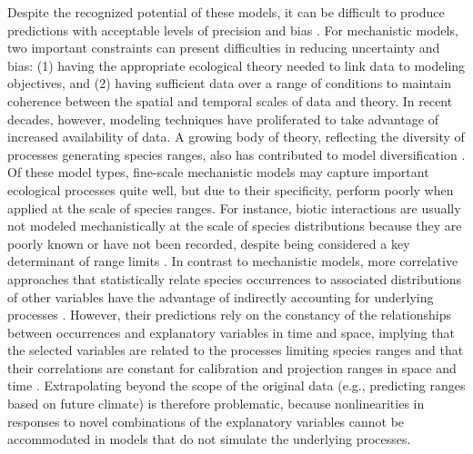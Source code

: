 \documentclass[11pt]{article}
\begin{document}
Despite the recognized potential of these models, it can be difficult to produce predictions with acceptable levels of precision and bias \citep{Guisan2013}.
For mechanistic models, two important constraints can present difficulties in reducing uncertainty and bias: (1) having the appropriate ecological theory needed to link data to modeling objectives, and (2) having sufficient data over a range of conditions to maintain coherence between the spatial and temporal scales of data and theory.
In recent decades, however, modeling techniques have proliferated to take advantage of increased availability of data. 
A growing body of theory, reflecting the diversity of processes generating species ranges, also has contributed to model diversification \citep{Boulangeat2012}.
Of these model types, fine-scale mechanistic models may capture important ecological processes quite well, but due to their specificity, perform poorly when applied at the scale of species ranges.
For instance, biotic interactions are usually not modeled mechanistically at the scale of species distributions because they are poorly known or have not been recorded, despite being considered a key determinant of range limits \citep{Holt2005, Pigot2013}. 
In contrast to mechanistic models, more correlative approaches that statistically relate species occurrences to associated distributions of other variables have the advantage of indirectly accounting for underlying processes \citep{Guisan2000}.
However, their predictions rely on the constancy of the relationships between occurrences and explanatory variables in time and space, implying that the selected variables are related to the processes limiting species ranges and that their correlations are constant for calibration and projection ranges in space and time \citep{Dormann2007}. 
Extrapolating beyond the scope of the original data (e.g., predicting ranges based on future climate) is therefore problematic, because nonlinearities in responses to novel combinations of the explanatory variables cannot be accommodated in models that do not simulate the underlying processes.
\end{document}
